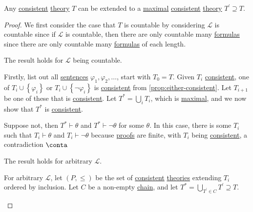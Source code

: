 \begin{theorem}\label{thm:extend-to-maximal}
	Any \hyperref[def:consistent]{consistent} \hyperref[def:theory]{theory} \(T\) can be extended to a \hyperref[def:maximal]{maximal} \hyperref[def:consistent]{consistent} \hyperref[def:theory]{theory} \(T^\prime \supseteq T\).
\end{theorem}
\begin{proof}
	We first consider the case that \(T\) is countable by considering \(\mathcal{L} \) is countable since if \(\mathcal{L} \) is countable, then there are only countable many \hyperref[def:formula]{formulas} since there are only countable many \hyperref[def:formula]{formulas} of each length.

	\begin{claim}
		The result holds for \(\mathcal{L} \) being countable.
	\end{claim}
	\begin{explanation}
		Firstly, list out all \hyperref[def:sentence]{sentences} \(\varphi _1, \varphi _2, \ldots \), start with \(T_0 = T\). Given \(T_i\) \hyperref[def:consistent]{consistent}, one of \(T_i \cup \left\{ \varphi _i \right\} \) or \(T_i \cup \left\{ \lnot \varphi _i \right\} \) is \hyperref[def:consistent]{consistent} from \autoref{prop:either-consistent}. Let \(T_{i+1} \) be one of these that is \hyperref[def:consistent]{consistent}. Let \(T^{\ast} = \bigcup_{i} T_i \), which is \hyperref[def:maximal]{maximal}, and we now show that \(T^{\ast} \) is \hyperref[def:consistent]{consistent}.

		Suppose not, then \(T^{\ast} \vdash \theta \) and \(T^{\ast} \vdash \lnot \theta \) for some \(\theta \). In this case, there is some \(T_i\) such that \(T_i \vdash \theta \) and \(T_i \vdash \lnot \theta \) because \hyperref[def:proof]{proofs} are finite, with \(T_i\) being \hyperref[def:consistent]{consistent}, a contradiction \(\conta\)
	\end{explanation}

	\begin{claim}
		The result holds for arbitrary \(\mathcal{L} \).
	\end{claim}
	\begin{explanation}
		For arbitrary \(\mathcal{L} \), let \((P, \leq )\) be the set of \hyperref[def:consistent]{consistent} \hyperref[def:theory]{theories} extending \(T_i\) ordered by inclusion. Let \(C\) be a non-empty \hyperref[def:chain]{chain}, and let \(T^{\ast} = \bigcup_{T^\prime \in C} T^\prime \supseteq T \).


\end{explanation}
\end{proof}

